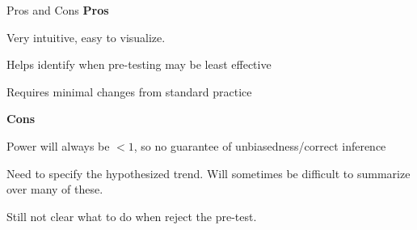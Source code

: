 \documentclass[usenames, dvipsnames, aspectratio = 169, 13pt]{beamer}
\newcommand{\backupend}{
   \setcounter{framenumber}{\value{finalframe}}
}
\newenvironment{wideitemize}{\itemize\addtolength{\itemsep}{10pt}}{\enditemize}
\begin{document}
\begin{frame}{Pros and Cons}
\textbf{Pros}
\begin{wideitemize}
    \item
    Very intuitive, easy to visualize.

    \item
    Helps identify when pre-testing may be least effective
    
    \item
    Requires minimal changes from standard practice
\end{wideitemize}

\textbf{Cons}

\begin{wideitemize}
    \item
    Power will always be $<1$, so no guarantee of unbiasedness/correct inference
    
    \item
    Need to specify the hypothesized trend. Will sometimes be difficult to summarize over many of these.
    
    \item
    Still not clear what to do when reject the pre-test.
\end{wideitemize}
    
\end{frame}






\backupend
\end{document}
